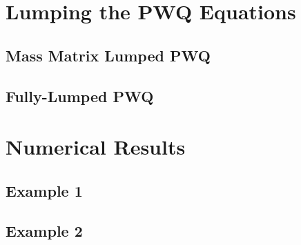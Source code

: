 \documentclass[preprint,review,10pt]{elsarticle}
\begin{document}
\section{Lumping the PWQ Equations} \label{sec::Lumping}

\subsection{Mass Matrix Lumped PWQ} \label{sec::Lumping_mass}

\subsection{Fully-Lumped PWQ} \label{sec::Lumping_full}


\section{Numerical Results} \label{sec::results}

\subsection{Example 1} \label{sec::results_E1}

\subsection{Example 2} \label{sec::results_E2}
\end{document}
